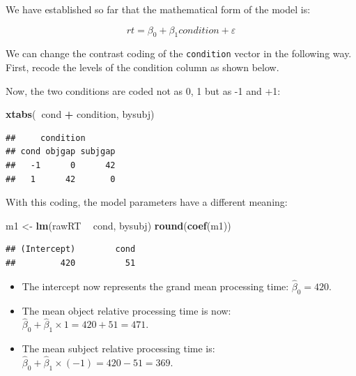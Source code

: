 \documentclass[12pt,]{krantz}
\newenvironment{Shaded}{\begin{snugshade}}{\end{snugshade}}
\newcommand{\CommentTok}[1]{\textcolor[rgb]{0.56,0.35,0.01}{\textit{#1}}}
\newcommand{\DecValTok}[1]{\textcolor[rgb]{0.00,0.00,0.81}{#1}}
\newcommand{\KeywordTok}[1]{\textcolor[rgb]{0.13,0.29,0.53}{\textbf{#1}}}
\newcommand{\NormalTok}[1]{#1}
\newcommand{\OperatorTok}[1]{\textcolor[rgb]{0.81,0.36,0.00}{\textbf{#1}}}
\newcommand{\StringTok}[1]{\textcolor[rgb]{0.31,0.60,0.02}{#1}}
\providecommand{\tightlist}{%
  \setlength{\itemsep}{0pt}\setlength{\parskip}{0pt}}
\begin{document}
We have established so far that the mathematical form of the model is:

\begin{equation}
rt = \beta_0 + \beta_1 condition + \varepsilon
\end{equation}

We can change the contrast coding of the \texttt{condition} vector in the following way. First, recode the levels of the condition column as shown below.

\begin{Shaded}
\end{Shaded}

Now, the two conditions are coded not as 0, 1 but as -1 and +1:

\begin{Shaded}
\begin{Highlighting}[]
\KeywordTok{xtabs}\NormalTok{(}\OperatorTok{~}\NormalTok{cond }\OperatorTok{+}\StringTok{ }\NormalTok{condition, bysubj)}
\end{Highlighting}
\end{Shaded}

\begin{verbatim}
##     condition
## cond objgap subjgap
##   -1      0      42
##   1      42       0
\end{verbatim}

With this coding, the model parameters have a different meaning:

\begin{Shaded}
\begin{Highlighting}[]
\NormalTok{m1 <-}\StringTok{ }\KeywordTok{lm}\NormalTok{(rawRT }\OperatorTok{~}\StringTok{ }\NormalTok{cond, bysubj)}
\KeywordTok{round}\NormalTok{(}\KeywordTok{coef}\NormalTok{(m1))}
\end{Highlighting}
\end{Shaded}

\begin{verbatim}
## (Intercept)        cond 
##         420          51
\end{verbatim}

\begin{itemize}
\tightlist
\item
  The intercept now represents the grand mean processing time: \(\hat \beta_0=420\).
\item
  The mean object relative processing time is now: \(\hat\beta_0+\hat\beta_1\times 1=420+51=471\).
\item
  The mean subject relative processing time is: \(\hat\beta_0+\hat\beta_1\times (-1)=420-51=369\).
\end{itemize}
\end{document}
